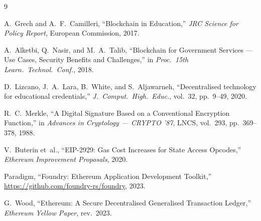 \documentclass[conference]{IEEEtran}
\begin{document}
\begin{thebibliography}{9}

A.~Grech and A.~F.~Camilleri,
``Blockchain in Education,''
\emph{JRC Science for Policy Report}, European Commission, 2017.

A.~Alketbi, Q.~Nasir, and M.~A.~Talib,
``Blockchain for Government Services --- Use Cases, Security Benefits
and Challenges,''
in \emph{Proc.\ 15th Learn.\ Technol.\ Conf.}, 2018.

D.~Lizcano, J.~A.~Lara, B.~White, and S.~Aljawarneh,
``Decentralised technology for educational credentials,''
\emph{J.\ Comput.\ High.\ Educ.}, vol.~32, pp.~9--49, 2020.

R.~C.~Merkle,
``A Digital Signature Based on a Conventional Encryption Function,''
in \emph{Advances in Cryptology --- CRYPTO '87},
LNCS, vol.~293, pp.~369--378, 1988.

V.~Buterin et~al.,
``EIP-2929: Gas Cost Increases for State Access Opcodes,''
\emph{Ethereum Improvement Proposals}, 2020.

Paradigm,
``Foundry: Ethereum Application Development Toolkit,''
\url{https://github.com/foundry-rs/foundry}, 2023.

G.~Wood,
``Ethereum: A Secure Decentralised Generalised Transaction Ledger,''
\emph{Ethereum Yellow Paper}, rev.\ 2023.

\end{thebibliography}
\end{document}
